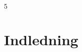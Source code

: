 5\documentclass[../main.tex]{subfiles}
\begin{document}
\section{Indledning}
\newpage
\end{document}
